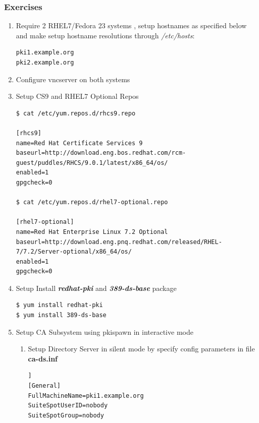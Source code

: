 \documentclass[12pt]{report}
\begin{document}
\subsubsection{Exercises}
    \begin{enumerate}[label*=\arabic*.]
        \item \label{setup1} Require 2 RHEL7/Fedora 23 systems , setup hostnames as specified below and make setup hostname
            resolutions through \textit{/etc/hosts}:
            \begin{lstlisting}
pki1.example.org
pki2.example.org
            \end{lstlisting}
        \item \label{setup2} Configure vncserver on both systems
        \item \label{setup3} Setup CS9 and RHEL7 Optional Repos
            \begin{lstlisting}[style=BashInputStyle]
$ cat /etc/yum.repos.d/rhcs9.repo

[rhcs9]
name=Red Hat Certificate Services 9
baseurl=http://download.eng.bos.redhat.com/rcm-guest/puddles/RHCS/9.0.1/latest/x86_64/os/
enabled=1   
gpgcheck=0

$ cat /etc/yum.repos.d/rhel7-optional.repo

[rhel7-optional]
name=Red Hat Enterprise Linux 7.2 Optional
baseurl=http://download.eng.pnq.redhat.com/released/RHEL-7/7.2/Server-optional/x86_64/os/
enabled=1
gpgcheck=0
            \end{lstlisting}

        \item \label{setup4} Setup Install \textbf{\textit{redhat-pki}} and \textbf{\textit{389-ds-base}} package 

            \begin{lstlisting}[style=BashInputStyle]
$ yum install redhat-pki
$ yum install 389-ds-base
            \end{lstlisting}
        
        \item \label{rootca} Setup CA Subsystem using pkispawn in interactive mode
            \begin{enumerate}[label*=\arabic*.]
                \item \label{ds1} Setup Directory Server in silent mode by specify config parameters in file \textbf{ca-ds.inf}
                    \begin{lstlisting}[style=configFile]]
[General]
FullMachineName=pki1.example.org 
SuiteSpotUserID=nobody
SuiteSpotGroup=nobody


\end{lstlisting}
\end{enumerate}
\end{enumerate}
\end{document}
